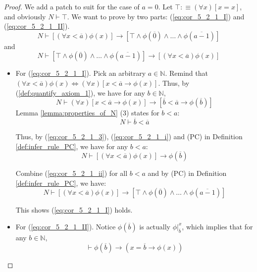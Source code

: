 \documentclass[11pt,letterpaper]{book}
\theoremstyle{definition}
\begin{document}
\begin{proof}
We add a patch to suit for the case of $a =0$. Let $ \top :\equiv (\forall x ) [x  = x]$, and obviously $N \vdash \top$. We want to prove by two parts: (\ref{eq:cor_5_2_1_I}) and (\ref{eq:cor_5_2_1_II}).
\begin{equation}
\label{eq:cor_5_2_1_I}
N \vdash [(\forall x < \overline{a}) \phi(x) ] \rightarrow [ \top \land \phi(\overline{0})  \land \ldots \land \phi (\overline{a-1}) ] \tag{I}
\end{equation}
and
\begin{equation}
\label{eq:cor_5_2_1_II}
N \vdash [ \top \land \phi(\overline{0})  \land \ldots \land \phi (\overline{a-1}) ] \rightarrow [(\forall x < \overline{a}) \phi(x) ] \tag{II}
\end{equation}
\begin{itemize}
\item{For (\ref{eq:cor_5_2_1_I}). Pick an arbitrary $a \in \mathbb{N}$. Remind that $ (\forall x < \overline{a}) \phi (x) \iff (\forall x) [x < \overline{a} \rightarrow \phi(x) ] $. Thus, by (\ref{def:quantify_axiom_1}), we have for any $b \in \mathbb{N}$,
\begin{equation}
N \vdash (\forall x) [x < \overline{a} \rightarrow \phi(x) ] \rightarrow [ \overline{b} < \overline{a} \rightarrow \phi(\overline{b}) ]
\label{eq:cor_5_2_1_i} \tag{i}
\end{equation}
Lemma \ref{lemma:properties_of_N} (3) states for $b < a$:
\begin{equation}
N \vdash \overline{b} < \overline{a} \label{eq:cor_5_2_1_3} \tag{3}
\end{equation}

Thus, by (\ref{eq:cor_5_2_1_3}), (\ref{eq:cor_5_2_1_i}) and (PC) in Definition \ref{def:infer_rule_PC}, we have for any $b < a$:
\begin{equation}
N \vdash [(\forall x < \overline{a} )  \phi(x) ] \rightarrow  \phi(\overline{b})  \label{eq:cor_5_2_1_ii} \tag{ii}
\end{equation}

Combine (\ref{eq:cor_5_2_1_ii}) for all $b < a$ and by (PC) in Definition \ref{def:infer_rule_PC}, we have:
\begin{equation}
N \vdash [(\forall x < \overline{a}) \phi(x) ] \rightarrow [ \top \land \phi(\overline{0})  \land \ldots \land \phi (\overline{a-1}) ] \nonumber
\end{equation}

This shows (\ref{eq:cor_5_2_1_I}) holds.
}
\item{For (\ref{eq:cor_5_2_1_II}). Notice $\phi(\overline{b})  $ is actually $\phi |_{\overline{b}} ^x$, which implies that for any $b \in \mathbb{N}$,
\begin{equation}
\vdash \phi(\overline{b}) \rightarrow (x = \overline{b} \rightarrow \phi(x) ) \label{eq:cor_5_2_1_iii} \tag{iii}
\end{equation}

}
\end{itemize}
\end{proof}
\end{document}
